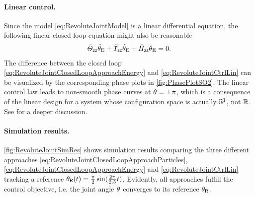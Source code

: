 \paragraph{Linear control.}
Since the model \eqref{eq:RevoluteJointModel} is a linear differential equation, the following linear closed loop equation might also be reasonable
\begin{align}\label{eq:RevoluteJointCtrlLin}
 \bar{\varTheta}_{\mathsf{z}\mathsf{z}} \ddot{\theta}_{\mathrm{E}} + \bar{\varUpsilon}_{\mathsf{z}\mathsf{z}} \dot{\theta}_{\mathrm{E}} + \bar{\varPi}_{\mathsf{z}\mathsf{z}} \theta_{\mathrm{E}} = 0.
\end{align}
The difference between the closed loop \eqref{eq:RevoluteJointClosedLoopApproachEnergy} and \eqref{eq:RevoluteJointCtrlLin} can be visualized by the corresponding phase plots in \autoref{fig:PhasePlotSO2}.
The linear control law leads to non-smooth phase curves at $\theta_{} = \pm\pi$, which is a consequence of the linear design for a system whose configuration space is actually $\mathbb{S}^1$, not $\mathbb{R}$.
See \cite[sec.\ 1.2]{Konz:AT} for a deeper discussion.


\paragraph{Simulation results.}
\autoref{fig:RevoluteJointSimRes} shows simulation results comparing the three different approaches \eqref{eq:RevoluteJointClosedLoopApproachParticles}, \eqref{eq:RevoluteJointClosedLoopApproachEnergy} and \eqref{eq:RevoluteJointCtrlLin} tracking a reference $\theta_{\mathsf{R}}(t) = \tfrac{\pi}{2}\sin(\tfrac{2\pi}{2.5}t)$.
Evidently, all approaches fulfill the control objective, i.e. the joint angle $\theta_{}$ converges to its reference $\theta_{\mathsf{R}}$.

